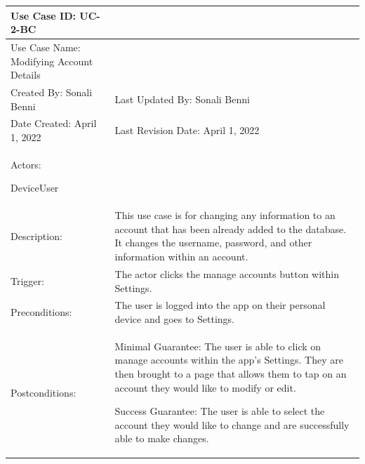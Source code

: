 \documentclass[stu]{apa7}
\newcommand{\nextitem}{\par\hspace*{\labelsep}\textbullet\hspace*{\labelsep}}
\begin{document}
\scriptsize{\begin{xltabular}{\textwidth}{|l|X|}
              \hline Use Case ID: UC-2-BC & \\ \hline

              Use Case Name: Modifying Account Details & \\ \hline

              Created By: Sonali Benni & Last Updated By: Sonali Benni \\ \hline

              Date Created: April 1, 2022 & Last Revision Date: April 1, 2022 \\ \hline

              Actors: \nextitem DeviceUser & \\ \hline

              Description: & This use case is for changing any information to an account that has been already added to the database. It changes the username, password, and other information within an account. \\ \hline

              Trigger: & The actor clicks the manage accounts button within Settings. \\ \hline

             Preconditions: & \nextitem The user is logged into the app on their personal device and goes to Settings.\\ \hline

              Postconditions: & \nextitem Minimal Guarantee: The user is able to click on manage accounts within the app’s Settings. They are then brought to a page that allows them to tap on an account they would like to modify or edit.
                                \nextitem Success Guarantee: The user is able to select the account they would like to change and are successfully able to make changes. \\ \hline


\end{xltabular}}
\end{document}
